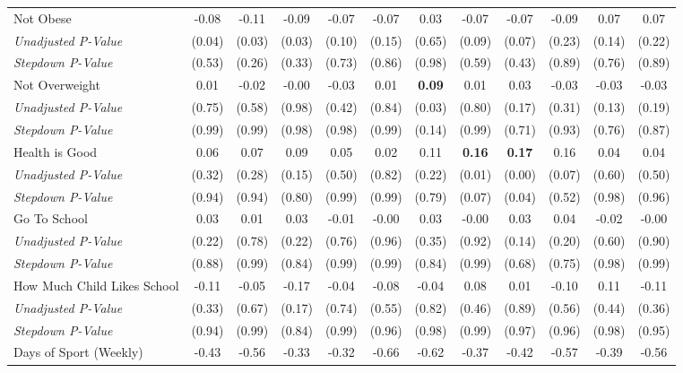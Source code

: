\begin{tabular}{l c c c c c c c c c c c}
Not Obese & -0.08 & -0.11 & -0.09 & -0.07 & -0.07 & 0.03 & -0.07 & -0.07 & -0.09 & 0.07 & 0.07 \\
\quad \textit{Unadjusted P-Value} & (0.04) & (0.03) & (0.03) & (0.10) & (0.15) & (0.65) & (0.09) & (0.07) & (0.23) & (0.14) & (0.22) \\
\quad \textit{Stepdown P-Value} & (0.53) & (0.26) & (0.33) & (0.73) & (0.86) & (0.98) & (0.59) & (0.43) & (0.89) & (0.76) & (0.89) \\
Not Overweight & 0.01 & -0.02 & -0.00 & -0.03 & 0.01 & \textbf{ 0.09 } & 0.01 & 0.03 & -0.03 & -0.03 & -0.03 \\
\quad \textit{Unadjusted P-Value} & (0.75) & (0.58) & (0.98) & (0.42) & (0.84) & (0.03) & (0.80) & (0.17) & (0.31) & (0.13) & (0.19) \\
\quad \textit{Stepdown P-Value} & (0.99) & (0.99) & (0.98) & (0.98) & (0.99) & (0.14) & (0.99) & (0.71) & (0.93) & (0.76) & (0.87) \\
Health is Good & 0.06 & 0.07 & 0.09 & 0.05 & 0.02 & 0.11 & \textbf{ 0.16 } & \textbf{ 0.17 } & 0.16 & 0.04 & 0.04 \\
\quad \textit{Unadjusted P-Value} & (0.32) & (0.28) & (0.15) & (0.50) & (0.82) & (0.22) & (0.01) & (0.00) & (0.07) & (0.60) & (0.50) \\
\quad \textit{Stepdown P-Value} & (0.94) & (0.94) & (0.80) & (0.99) & (0.99) & (0.79) & (0.07) & (0.04) & (0.52) & (0.98) & (0.96) \\
Go To School & 0.03 & 0.01 & 0.03 & -0.01 & -0.00 & 0.03 & -0.00 & 0.03 & 0.04 & -0.02 & -0.00 \\
\quad \textit{Unadjusted P-Value} & (0.22) & (0.78) & (0.22) & (0.76) & (0.96) & (0.35) & (0.92) & (0.14) & (0.20) & (0.60) & (0.90) \\
\quad \textit{Stepdown P-Value} & (0.88) & (0.99) & (0.84) & (0.99) & (0.99) & (0.84) & (0.99) & (0.68) & (0.75) & (0.98) & (0.99) \\
How Much Child Likes School & -0.11 & -0.05 & -0.17 & -0.04 & -0.08 & -0.04 & 0.08 & 0.01 & -0.10 & 0.11 & -0.11 \\
\quad \textit{Unadjusted P-Value} & (0.33) & (0.67) & (0.17) & (0.74) & (0.55) & (0.82) & (0.46) & (0.89) & (0.56) & (0.44) & (0.36) \\
\quad \textit{Stepdown P-Value} & (0.94) & (0.99) & (0.84) & (0.99) & (0.96) & (0.98) & (0.99) & (0.97) & (0.96) & (0.98) & (0.95) \\
Days of Sport (Weekly) & -0.43 & -0.56 & -0.33 & -0.32 & -0.66 & -0.62 & -0.37 & -0.42 & -0.57 & -0.39 & -0.56 \\

\end{tabular}
